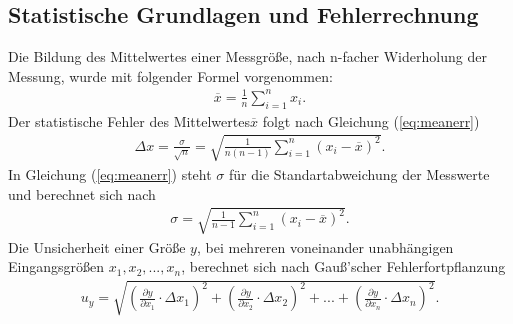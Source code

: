 \subsection{Statistische Grundlagen und Fehlerrechnung}
Die Bildung des Mittelwertes einer Messgröße, nach n-facher Widerholung der Messung, wurde mit folgender Formel vorgenommen:
\begin{align}
  \overline{x} = \frac{1}{n} \sum_{i=1}^{n} x_i.
\label{eq:mean}
\end{align}
Der statistische Fehler des Mittelwertes$ \overline{x}$ folgt nach Gleichung (\ref{eq:meanerr})
\begin{align}
  \Delta x = \frac{\sigma}{\sqrt{n}} = \sqrt{\frac{1}{n(n-1)}\sum_{i=1}^{n} (x_i-\overline{x})^2}.
\label{eq:meanerr}
\end{align}
In Gleichung (\ref{eq:meanerr}) steht $\sigma$ für die Standartabweichung der Messwerte und berechnet sich nach
\begin{align}
  \sigma = \sqrt{\frac{1}{n-1}\sum_{i=1}^{n} (x_i-\overline{x})^2}.
\label{eq:stabw}
\end{align}
Die Unsicherheit einer Größe $y$, bei mehreren voneinander unabhängigen Eingangsgrößen $x_1, x_2, ..., x_n$, berechnet sich nach Gauß'scher Fehlerfortpflanzung
\begin{align}
u_y =\sqrt{ \left ( \frac{\partial y}{\partial x_1} \cdot \Delta x_1 \right )^2 +\left ( \frac{\partial y}{\partial x_2} \cdot \Delta x_2 \right )^2 + ... + \left ( \frac{\partial y}{\partial x_n} \cdot \Delta x_n \right )^2}.
  \label{eq:gauss}
\end{align}

